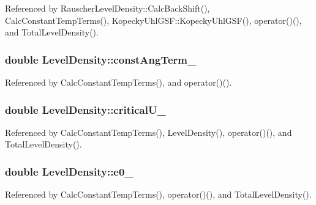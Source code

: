 Referenced by Rauscher\-Level\-Density\-::\-Calc\-Back\-Shift(), Calc\-Constant\-Temp\-Terms(), Kopecky\-Uhl\-G\-S\-F\-::\-Kopecky\-Uhl\-G\-S\-F(), operator()(), and Total\-Level\-Density().

\hypertarget{classLevelDensity_acfc91464640c910baac56f85751b7dac}{
\subsubsection[{const\-Ang\-Term\-\_\-}]{\setlength{\rightskip}{0pt plus 5cm}double Level\-Density\-::const\-Ang\-Term\-\_\-\hspace{0.3cm}{\ttfamily [protected]}}}\label{classLevelDensity_acfc91464640c910baac56f85751b7dac}


Referenced by Calc\-Constant\-Temp\-Terms(), and operator()().

\hypertarget{classLevelDensity_a580dc958baa563bf774a0a6f6b4fea7e}{
\subsubsection[{critical\-U\-\_\-}]{\setlength{\rightskip}{0pt plus 5cm}double Level\-Density\-::critical\-U\-\_\-\hspace{0.3cm}{\ttfamily [protected]}}}\label{classLevelDensity_a580dc958baa563bf774a0a6f6b4fea7e}


Referenced by Calc\-Constant\-Temp\-Terms(), Level\-Density(), operator()(), and Total\-Level\-Density().

\hypertarget{classLevelDensity_a61c66e8f640cbffe7d2977d69981e30c}{
\subsubsection[{e0\-\_\-}]{\setlength{\rightskip}{0pt plus 5cm}double Level\-Density\-::e0\-\_\-\hspace{0.3cm}{\ttfamily [protected]}}}\label{classLevelDensity_a61c66e8f640cbffe7d2977d69981e30c}


Referenced by Calc\-Constant\-Temp\-Terms(), operator()(), and Total\-Level\-Density().

